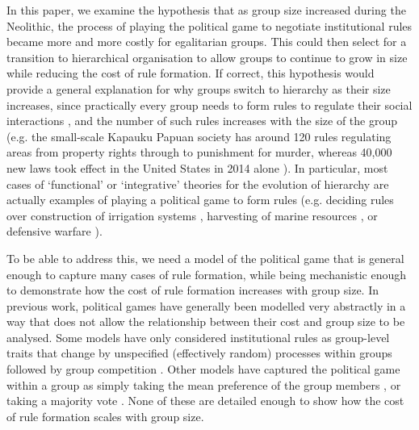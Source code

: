 \documentclass{rstb}
\begin{document}
\begin{linenumbers}
In this paper, we examine the hypothesis that as group size increased during the Neolithic, the process of playing the political game to negotiate institutional rules became more and more costly for egalitarian groups. This could then select for a transition to hierarchical organisation to allow groups to continue to grow in size while reducing the cost of rule formation. If correct, this hypothesis would provide a general explanation for why groups switch to hierarchy as their size increases, since practically every group needs to form rules to regulate their social interactions \cite{North:1990:a,Fukuyama:2011:a}, and the number of such rules increases with the size of the group (e.g. the small-scale Kapauku Papuan society has around 120 rules regulating areas from property rights through to punishment for murder, whereas 40,000 new laws took effect in the United States in 2014 alone \cite{Singh:2017:a}). In particular, most cases of `functional' or `integrative' theories for the evolution of hierarchy \cite{Calvert:1992:a,vanVugt:2006:a,King:2009:a,Hooper:2010:a,Sterelny:2013:a} are actually examples of playing a political game to form rules (e.g. deciding rules over construction of irrigation systems \cite{Wittfogel:1957:a,Nichols:1993:a,Spencer:1993:a,Carballo:2012:a}, harvesting of marine resources \cite{Arnold:1995:a,Friesen:1999:a,Alvard:2002:a}, or defensive warfare \cite{Boone:1992:a,Roscoe:2013:a}). 

To be able to address this, we need a model of the political game that is general enough to capture many cases of rule formation, while being mechanistic enough to demonstrate how the cost of rule formation increases with group size. In previous work, political games have generally been modelled very abstractly in a way that does not allow the relationship between their cost and group size to be analysed. Some models have only considered institutional rules as group-level traits that change by unspecified (effectively random) processes within groups followed by group competition \cite{Turchin:2013:a,Richerson:2016:a}. Other models have captured the political game within a group as simply taking the mean preference of the group members \cite{Powers:2013:a,Powers:2017:a}, or taking a majority vote \cite{Currie:2021:a}. None of these are detailed enough to show how the cost of rule formation scales with group size. 


\end{linenumbers}
\end{document}
